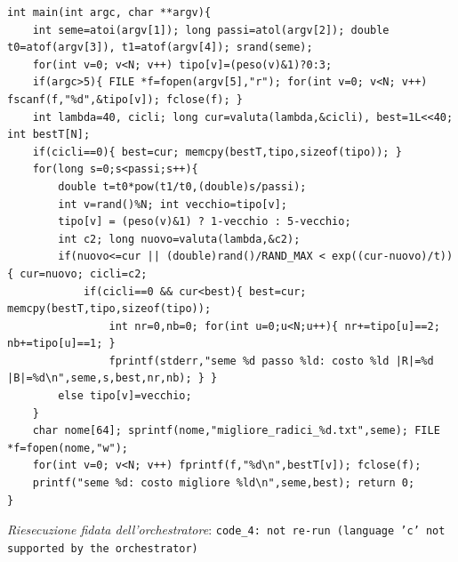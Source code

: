 \documentclass[11pt,a4paper]{article}
\begin{document}
\begin{lstlisting}[caption={attempt\_001 code\_4 [c, rigore exact] — Simulated annealing (exploration only) over pairs (R = even vertices kept in S, B' = odd v — verdetto del Referee: REJECT}]
int main(int argc, char **argv){
    int seme=atoi(argv[1]); long passi=atol(argv[2]); double t0=atof(argv[3]), t1=atof(argv[4]); srand(seme);
    for(int v=0; v<N; v++) tipo[v]=(peso(v)&1)?0:3;
    if(argc>5){ FILE *f=fopen(argv[5],"r"); for(int v=0; v<N; v++) fscanf(f,"%d",&tipo[v]); fclose(f); }
    int lambda=40, cicli; long cur=valuta(lambda,&cicli), best=1L<<40; int bestT[N];
    if(cicli==0){ best=cur; memcpy(bestT,tipo,sizeof(tipo)); }
    for(long s=0;s<passi;s++){
        double t=t0*pow(t1/t0,(double)s/passi);
        int v=rand()%N; int vecchio=tipo[v];
        tipo[v] = (peso(v)&1) ? 1-vecchio : 5-vecchio;
        int c2; long nuovo=valuta(lambda,&c2);
        if(nuovo<=cur || (double)rand()/RAND_MAX < exp((cur-nuovo)/t)){ cur=nuovo; cicli=c2;
            if(cicli==0 && cur<best){ best=cur; memcpy(bestT,tipo,sizeof(tipo));
                int nr=0,nb=0; for(int u=0;u<N;u++){ nr+=tipo[u]==2; nb+=tipo[u]==1; }
                fprintf(stderr,"seme %d passo %ld: costo %ld |R|=%d |B|=%d\n",seme,s,best,nr,nb); } }
        else tipo[v]=vecchio;
    }
    char nome[64]; sprintf(nome,"migliore_radici_%d.txt",seme); FILE *f=fopen(nome,"w");
    for(int v=0; v<N; v++) fprintf(f,"%d\n",bestT[v]); fclose(f);
    printf("seme %d: costo migliore %ld\n",seme,best); return 0;
}

\end{lstlisting}
\noindent\emph{Riesecuzione fidata dell'orchestratore}: \texttt{code\_4: not re-run (language 'c' not supported by the orchestrator)}
\end{document}
